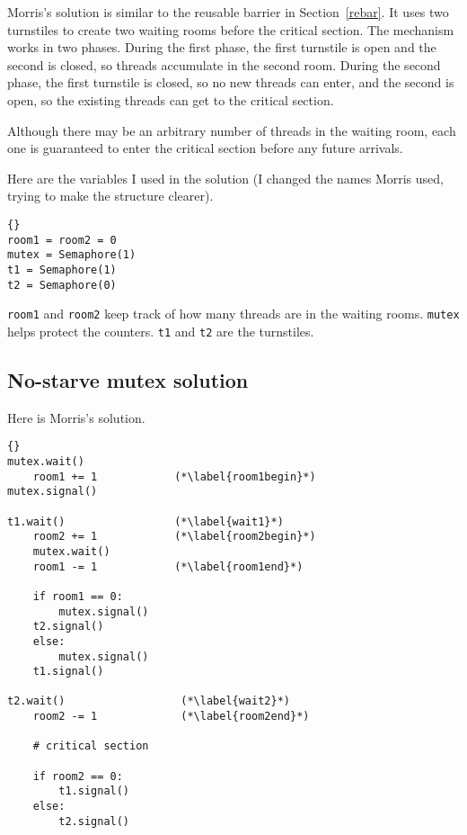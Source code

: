 \documentclass{book}
\newcommand{\clearemptydoublepage}{\newpage\cleardoublepage}
\begin{document}
Morris's solution is similar to the reusable barrier in
Section~\ref{rebar}.  It uses two turnstiles to create two waiting
rooms before the critical section.  The mechanism works in two phases.
During the first phase, the first turnstile is open and the second is
closed, so threads accumulate in the second room.  During the second
phase, the first turnstile is closed, so no new threads can enter, and
the second is open, so the existing threads can get to the critical
section.

Although there may be an arbitrary number of threads in the waiting
room, each one is guaranteed to enter the critical section before any
future arrivals.

Here are the variables I used in the solution (I changed the
names Morris used, trying to make the structure clearer).

\begin{lstlisting}[title={No-starve mutex hint}]{}
room1 = room2 = 0
mutex = Semaphore(1)
t1 = Semaphore(1)
t2 = Semaphore(0)
\end{lstlisting}

{\tt room1} and {\tt room2} keep track of how many threads are in the
waiting rooms.  {\tt mutex} helps protect the counters.  {\tt t1} and
{\tt t2} are the turnstiles.


\clearemptydoublepage
\subsection{No-starve mutex solution}

Here is Morris's solution.

\begin{lstlisting}[title={Morris's algorithm}]{}
mutex.wait()
    room1 += 1            (*\label{room1begin}*)
mutex.signal()
                           
t1.wait()                 (*\label{wait1}*)
    room2 += 1            (*\label{room2begin}*)
    mutex.wait()
    room1 -= 1            (*\label{room1end}*)

    if room1 == 0: 
        mutex.signal()
	t2.signal()
    else: 
        mutex.signal()
	t1.signal()

t2.wait()                  (*\label{wait2}*)
    room2 -= 1             (*\label{room2end}*)

    # critical section

    if room2 == 0:
        t1.signal()
    else:
        t2.signal()
\end{lstlisting}
\end{document}
